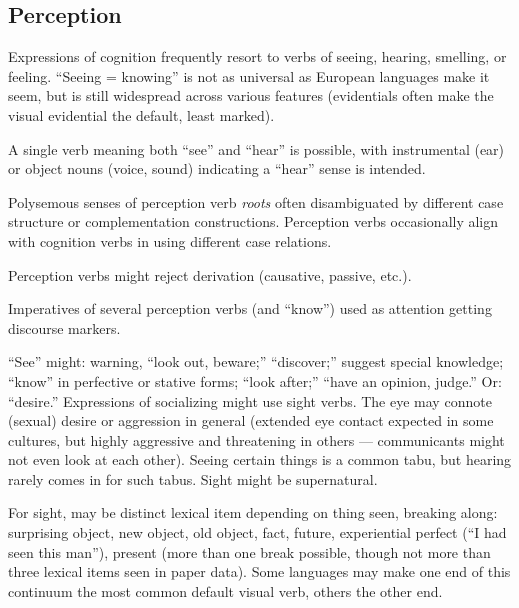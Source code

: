 \documentclass[11pt]{article}
\begin{document}
{\subsection{Perception}
Expressions of cognition frequently resort to verbs of seeing,
hearing, smelling, or feeling.  ``Seeing = knowing'' is not as
universal as European languages make it seem, but is still widespread
across various features (evidentials often make the visual evidential
the default, least marked).

A single verb meaning both ``see'' and ``hear'' is possible, with
instrumental (ear) or object nouns (voice, sound) indicating a
``hear'' sense is intended.

Polysemous senses of perception verb \textit{roots} often
disambiguated by different case structure or complementation
constructions.  Perception verbs occasionally align with cognition
verbs in using different case relations.

Perception verbs might reject derivation (causative, passive, etc.).

Imperatives of several perception verbs (and ``know'') used as
attention getting discourse markers.

``See'' might: warning, ``look out, beware;'' ``discover;'' suggest
special knowledge; ``know'' in perfective or stative forms; ``look
after;'' ``have an opinion, judge.'' Or: ``desire.''  Expressions of
socializing might use sight verbs.  The eye may connote (sexual)
desire or aggression in general (extended eye contact expected in some
cultures, but highly aggressive and threatening in others —
communicants might not even look at each other).  Seeing certain
things is a common tabu, but hearing rarely comes in for such tabus.
Sight might be supernatural.

For sight, may be distinct lexical item depending on thing seen,
breaking along: surprising object, new object, old object, fact,
future, experiential perfect (``I had seen this man''), present (more
than one break possible, though not more than three lexical items seen
in paper data).  Some languages may make one end of this continuum the
most common default visual verb, others the other end.

}
\end{document}
